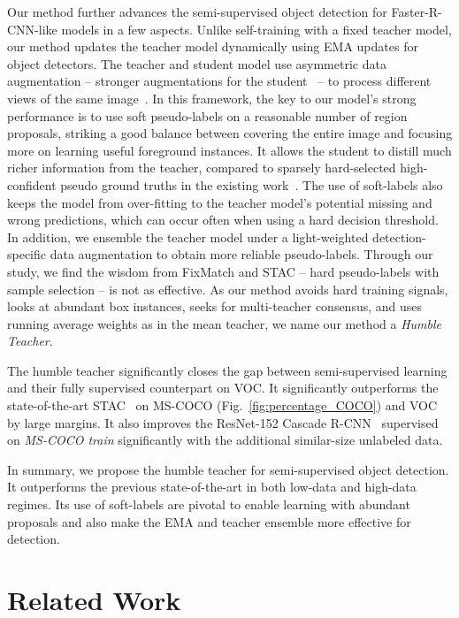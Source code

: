 \documentclass[final]{cvpr}
\begin{document}
Our method further advances the semi-supervised object detection for Faster-R-CNN-like models in a few aspects. 
Unlike self-training with a fixed teacher model, our method updates the teacher model dynamically using EMA updates for object detectors. 
The teacher and student model use asymmetric data augmentation -- stronger augmentations for the student~\cite{xie2019unsupervised,berthelot2019remixmatch,sohn2020fixmatch,sohn2020simple} -- to process different views of the same image~\cite{shorten2019survey}. 
In this framework, the key to our model's strong performance is to use soft pseudo-labels on a reasonable number of region proposals, striking a good balance between covering the entire image and focusing more on learning useful foreground instances. 
It allows the student to distill much richer information from the teacher, compared to sparsely hard-selected high-confident pseudo ground truths in the existing work~\cite{sohn2020simple}. 
The use of soft-labels also keeps the model from over-fitting to the teacher model's potential missing and wrong predictions, which can occur often when using a hard decision threshold. 
In addition, we ensemble the teacher model under a light-weighted detection-specific data augmentation to obtain more reliable pseudo-labels. 
Through our study, we find the wisdom from FixMatch and STAC -- hard pseudo-labels with sample selection -- is not as effective. As our method avoids hard training signals, looks at abundant box instances, seeks for multi-teacher consensus, and uses running average weights as in the mean teacher, we name our method a \emph{Humble Teacher}. 

The humble teacher significantly closes the gap between semi-supervised learning and their fully supervised counterpart on VOC. 
It significantly outperforms the state-of-the-art STAC~\cite{sohn2020simple} on MS-COCO (Fig.~\ref{fig:percentage_COCO}) and VOC by large margins. 
It also improves the ResNet-152 Cascade R-CNN~\cite{cai2018cascade} supervised on \textit{MS-COCO train} significantly with the additional similar-size unlabeled data. 

In summary, we propose the humble teacher for semi-supervised object detection. 
It outperforms the previous state-of-the-art in both low-data and high-data regimes.
Its use of soft-labels are pivotal to enable learning with abundant proposals and also make the EMA and teacher ensemble more effective for detection. 

\section{Related Work}
\end{document}
